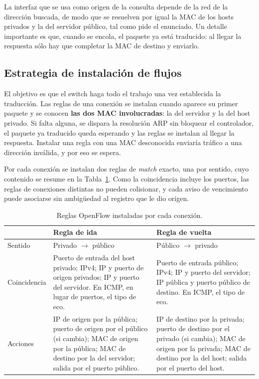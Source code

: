 ﻿\documentclass[10pt,a4paper]{article}
\begin{document}
La interfaz que se usa como origen de la consulta depende de la red de la dirección
buscada, de modo que se resuelven por igual la MAC de los hosts privados y la del
servidor público, tal como pide el enunciado. Un detalle importante es que, cuando se
encola, el paquete ya está traducido: al llegar la respuesta sólo hay que completar la
MAC de destino y enviarlo.

\subsection{Estrategia de instalación de flujos}

El objetivo es que el switch haga todo el trabajo una vez establecida la traducción.
Las reglas de una conexión se instalan cuando aparece su primer paquete y se conocen
\textbf{las dos MAC involucradas}: la del servidor y la del host privado. Si falta
alguna, se dispara la resolución ARP sin bloquear el controlador, el paquete ya
traducido queda esperando y las reglas se instalan al llegar la respuesta. Instalar
una regla con una MAC desconocida enviaría tráfico a una dirección inválida, y por eso
se espera.

Por cada conexión se instalan dos reglas de \emph{match} exacto, una por sentido,
cuyo contenido se resume en la Tabla~\ref{tab:flujos}. Como la coincidencia incluye
los puertos, las reglas de conexiones distintas no pueden colisionar, y cada aviso de
vencimiento puede asociarse sin ambigüedad al registro que le dio origen.

\begin{table}[H]
\centering
\small
\begin{tabular}{p{}p{}p{}}
\toprule
 & \textbf{Regla de ida} & \textbf{Regla de vuelta} \\
\midrule
Sentido & Privado $\rightarrow$ público & Público $\rightarrow$ privado \\
\midrule
Coincidencia &
Puerto de entrada del host privado; IPv4; IP y puerto de origen privados; IP y
puerto del servidor. En ICMP, en lugar de puertos, el tipo de eco. &
Puerto de entrada público; IPv4; IP y puerto del servidor; IP pública y puerto
público de destino. En ICMP, el tipo de eco. \\
\midrule
Acciones &
IP de origen por la pública; puerto de origen por el público (si cambia); MAC de
origen por la pública; MAC de destino por la del servidor; salida por el puerto
público. &
IP de destino por la privada; puerto de destino por el privado (si cambia); MAC de
origen por la privada; MAC de destino por la del host; salida por el puerto del
host. \\
\bottomrule
\end{tabular}
\caption{Reglas OpenFlow instaladas por cada conexión.}
\label{tab:flujos}
\end{table}
\end{document}
